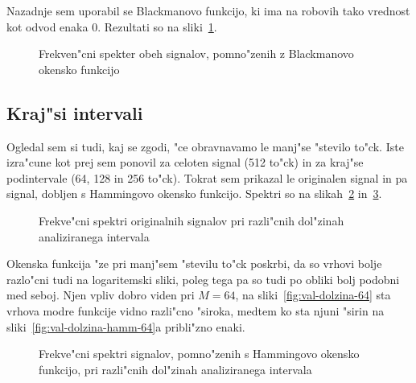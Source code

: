 \documentclass[a4paper,10pt]{article}
\begin{document}
Nazadnje sem uporabil se Blackmanovo funkcijo, ki ima na robovih tako vrednost kot odvod enaka 0. Rezultati so na sliki~\ref{fig:val-black}. 

\begin{figure}[h]
 
\caption{Frekven"cni spekter obeh signalov, pomno"zenih z Blackmanovo okensko funkcijo}
\label{fig:val-black}
\end{figure}

\cleardoublepage
\subsection{Kraj"si intervali}

Ogledal sem si tudi, kaj se zgodi, "ce obravnavamo le manj"se "stevilo to"ck. Iste izra"cune kot prej sem ponovil za celoten signal (512 to"ck) in za kraj"se podintervale (64, 128 in 256 to"ck). Tokrat sem prikazal le originalen signal in pa signal, dobljen s Hammingovo okensko funkcijo. Spektri so na slikah~\ref{fig:val-dolzina} in~\ref{fig:val-dolzina-hamm}. 

\begin{figure}[h]
 \subfigure[$M = 64$]{\label{fig:val-dolzina-64}} 
 \subfigure[$M = 128$]{}
 \subfigure[$M = 256$]{}
 \subfigure[$M = 512$]{}
\caption{Frekve"cni spektri originalnih signalov pri razli"cnih dol"zinah analiziranega intervala}
\label{fig:val-dolzina}
\end{figure}

Okenska funkcija "ze pri manj"sem "stevilu to"ck poskrbi, da so vrhovi bolje razlo"cni tudi na logaritemski sliki, poleg tega pa so tudi po obliki bolj podobni med seboj. Njen vpliv dobro viden pri $M=64$, na sliki~\ref{fig:val-dolzina-64} sta vrhova modre funkcije vidno razli"cno "siroka, medtem ko sta njuni "sirin na sliki~\ref{fig:val-dolzina-hamm-64}a pribli"zno enaki. 

\begin{figure}[h]
 \subfigure[$M = 64$]{\label{fig:val-dolzina-hamm-64}} 
 \subfigure[$M = 128$]{}
 \subfigure[$M = 256$]{}
 \subfigure[$M = 512$]{}
\caption{Frekve"cni spektri signalov, pomno"zenih s Hammingovo okensko funkcijo, pri razli"cnih dol"zinah analiziranega intervala}
\label{fig:val-dolzina-hamm}
\end{figure}
\end{document}
